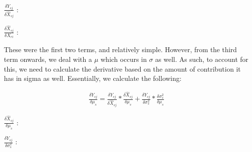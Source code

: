 {\Large $\frac{\delta Y_{sj}}{\delta \hat{X}_{sj}}$ }:
\vspace{1cm}

{\Large $\frac{\delta \hat{X}_{sj}}{\delta {X}_{ri}}$ }:
\vspace{1cm}

These were the first two terms, and relatively simple. However, from the third term onwards, 
we deal with a $\mu$ which occurs in $\sigma$ as well. As such, to account for this, we need to 
calculate the derivative based on the amount of contribution it has in sigma as well. Essentially,
we calculate the following:

\begin{align}
    \frac{\delta Y_{sj}}{\delta \mu_s} = \frac{\delta Y_{sj}}{\delta \hat{X}_{sj}} 
        * \frac{\delta \hat{X}_{sj}}{\delta \mu_s}
        + \frac{\delta Y_{sj}}{\delta \sigma^2_s} * \frac{\delta \sigma^2_s}{\delta \mu_s}
\end{align}

{\Large $\frac{\delta \hat{X}_{sj}}{\delta \mu_s}$ }:
\vspace{1cm}

{\Large $\frac{\delta Y_{sj}}{\delta \sigma_s^2}$ }:
\vspace{1cm}

